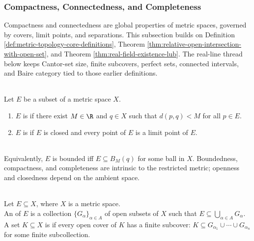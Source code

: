\subsubsection{Compactness, Connectedness, and Completeness}


Compactness and connectedness are global properties of metric spaces, governed by covers, limit points, and separations. This subsection builds on Definition \ref{def:metric-topology-core-definitions}, Theorem \ref{thm:relative-open-intersection-with-open-set}, and Theorem \ref{thm:real-field-existence-lub}. The real-line thread below keeps Cantor-set size, finite subcovers, perfect sets, connected intervals, and Baire category tied to those earlier definitions.

\begin{definition} \label{def:bounded-and-perfect-metric-sets} \\
Let $E$ be a subset of a metric space $X$.
\begin{enumerate}[label=(\roman*)]
\setlength{\itemsep}{0pt}
\item $E$ is  if there exist $M\in\R$ and $q\in X$ such that $d(p,q)<M$ for all $p\in E$.
\item $E$ is  if $E$ is closed and every point of $E$ is a limit point of $E$.
\end{enumerate}
\end{definition}

\begin{remark} \label{rem:boundedness-and-intrinsic-metric-properties} \\
Equivalently, $E$ is bounded iff $E\subseteq B_M(q)$ for some ball in $X$. Boundedness, compactness, and completeness are intrinsic to the restricted metric; openness and closedness depend on the ambient space.
\end{remark}

\begin{definition} \label{def:open-cover-and-compactness} \\
Let $E\subseteq X$, where $X$ is a metric space.\\
An  of $E$ is a collection $\{G_\alpha\}_{\alpha\in A}$ of open subsets of $X$ such that $E\subseteq\bigcup\limits_{\alpha\in A}G_\alpha$. A set $K\subseteq X$ is  if every open cover of $K$ has a finite subcover: $K\subseteq G_{\alpha_1}\cup\cdots\cup G_{\alpha_n}$ for some finite subcollection.
\end{definition}


